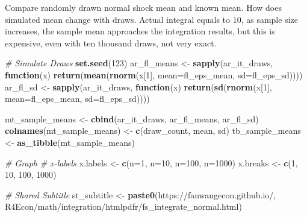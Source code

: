 \documentclass[
]{book}
\newenvironment{Shaded}{\begin{snugshade}}{\end{snugshade}}
\newcommand{\CommentTok}[1]{\textcolor[rgb]{0.56,0.35,0.01}{\textit{#1}}}
\newcommand{\ControlFlowTok}[1]{\textcolor[rgb]{0.13,0.29,0.53}{\textbf{#1}}}
\newcommand{\DataTypeTok}[1]{\textcolor[rgb]{0.13,0.29,0.53}{#1}}
\newcommand{\DecValTok}[1]{\textcolor[rgb]{0.00,0.00,0.81}{#1}}
\newcommand{\KeywordTok}[1]{\textcolor[rgb]{0.13,0.29,0.53}{\textbf{#1}}}
\newcommand{\NormalTok}[1]{#1}
\newcommand{\StringTok}[1]{\textcolor[rgb]{0.31,0.60,0.02}{#1}}
\begin{document}
Compare randomly drawn normal shock mean and known mean. How does simulated mean change with draws. Actual integral equals to \(10\), as sample size increases, the sample mean approaches the integration results, but this is expensive, even with ten thousand draws, not very exact.

\begin{Shaded}
\begin{Highlighting}[]
\CommentTok{\# Simulate Draws}
\KeywordTok{set.seed}\NormalTok{(}\DecValTok{123}\NormalTok{)}
\NormalTok{ar\_fl\_means \textless{}{-}}
\StringTok{  }\KeywordTok{sapply}\NormalTok{(ar\_it\_draws, }\ControlFlowTok{function}\NormalTok{(x)}
    \KeywordTok{return}\NormalTok{(}\KeywordTok{mean}\NormalTok{(}\KeywordTok{rnorm}\NormalTok{(x[}\DecValTok{1}\NormalTok{], }\DataTypeTok{mean=}\NormalTok{fl\_eps\_mean, }\DataTypeTok{sd=}\NormalTok{fl\_eps\_sd))))}
\NormalTok{ar\_fl\_sd \textless{}{-}}
\StringTok{  }\KeywordTok{sapply}\NormalTok{(ar\_it\_draws, }\ControlFlowTok{function}\NormalTok{(x)}
    \KeywordTok{return}\NormalTok{(}\KeywordTok{sd}\NormalTok{(}\KeywordTok{rnorm}\NormalTok{(x[}\DecValTok{1}\NormalTok{], }\DataTypeTok{mean=}\NormalTok{fl\_eps\_mean, }\DataTypeTok{sd=}\NormalTok{fl\_eps\_sd))))}

\NormalTok{mt\_sample\_means \textless{}{-}}\StringTok{ }\KeywordTok{cbind}\NormalTok{(ar\_it\_draws, ar\_fl\_means, ar\_fl\_sd)}
\KeywordTok{colnames}\NormalTok{(mt\_sample\_means) \textless{}{-}}\StringTok{ }\KeywordTok{c}\NormalTok{(}\StringTok{\textquotesingle{}draw\_count\textquotesingle{}}\NormalTok{, }\StringTok{\textquotesingle{}mean\textquotesingle{}}\NormalTok{, }\StringTok{\textquotesingle{}sd\textquotesingle{}}\NormalTok{)}
\NormalTok{tb\_sample\_means \textless{}{-}}\StringTok{ }\KeywordTok{as\_tibble}\NormalTok{(mt\_sample\_means)}

\CommentTok{\# Graph}
\CommentTok{\# x{-}labels}
\NormalTok{x.labels \textless{}{-}}\StringTok{ }\KeywordTok{c}\NormalTok{(}\StringTok{\textquotesingle{}n=1\textquotesingle{}}\NormalTok{, }\StringTok{\textquotesingle{}n=10\textquotesingle{}}\NormalTok{, }\StringTok{\textquotesingle{}n=100\textquotesingle{}}\NormalTok{, }\StringTok{\textquotesingle{}n=1000\textquotesingle{}}\NormalTok{)}
\NormalTok{x.breaks \textless{}{-}}\StringTok{ }\KeywordTok{c}\NormalTok{(}\DecValTok{1}\NormalTok{, }\DecValTok{10}\NormalTok{, }\DecValTok{100}\NormalTok{, }\DecValTok{1000}\NormalTok{)}

\CommentTok{\# Shared Subtitle}
\NormalTok{st\_subtitle \textless{}{-}}\StringTok{ }\KeywordTok{paste0}\NormalTok{(}\StringTok{\textquotesingle{}https://fanwangecon.github.io/\textquotesingle{}}\NormalTok{,}
                      \StringTok{\textquotesingle{}R4Econ/math/integration/htmlpdfr/fs\_integrate\_normal.html\textquotesingle{}}\NormalTok{)}


\end{Highlighting}
\end{Shaded}
\end{document}
